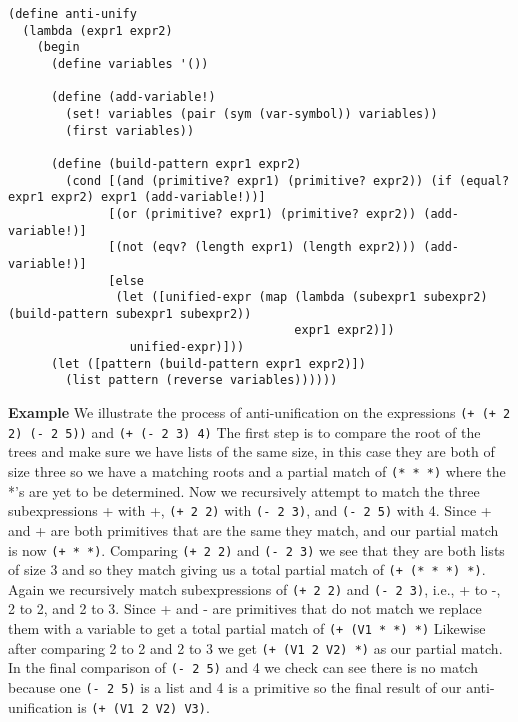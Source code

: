 \documentclass[a4paper,10pt]{article}
\begin{document}
\begin{lstlisting}[frame=trBL]
(define anti-unify
  (lambda (expr1 expr2)
    (begin
      (define variables '())

      (define (add-variable!)
        (set! variables (pair (sym (var-symbol)) variables))
        (first variables))
      
      (define (build-pattern expr1 expr2)
        (cond [(and (primitive? expr1) (primitive? expr2)) (if (equal? expr1 expr2) expr1 (add-variable!))]
              [(or (primitive? expr1) (primitive? expr2)) (add-variable!)]
              [(not (eqv? (length expr1) (length expr2))) (add-variable!)]
              [else
               (let ([unified-expr (map (lambda (subexpr1 subexpr2) (build-pattern subexpr1 subexpr2))
                                        expr1 expr2)])
                 unified-expr)]))
      (let ([pattern (build-pattern expr1 expr2)])
        (list pattern (reverse variables))))))
\end{lstlisting}

{\bf Example} We illustrate the process of anti-unification on the expressions \texttt{(+ (+ 2 2) (- 2 5))} and \texttt{(+ (- 2 3) 4)}
The first step is to compare the root of the trees and make sure we have lists of the same size, in this case they are both of size three so we have a matching roots and a partial match of \texttt{(* * *)} where the *'s are yet to be determined.
Now we recursively attempt to match the three subexpressions + with +, \texttt{(+ 2 2)} with \texttt{(- 2 3)}, and \texttt{(- 2 5)} with 4.
Since + and + are both primitives that are the same they match, and our partial match is now \texttt{(+ * *)}.
Comparing \texttt{(+ 2 2)} and \texttt{(- 2 3)} we see that they are both lists of size 3 and so they match giving us a total partial match of \texttt{(+ (* * *) *)}.
Again we recursively match subexpressions of \texttt{(+ 2 2)} and \texttt{(- 2 3)}, i.e., + to -, 2 to 2, and 2 to 3.
Since + and - are primitives that do not match we replace them with a variable to get a total partial match of \texttt{(+ (V1 * *) *)}
Likewise after comparing 2 to 2 and 2 to 3 we get \texttt{(+ (V1 2 V2) *)} as our partial match.
In the final comparison of \texttt{(- 2 5)} and 4 we check can see there is no match because one \texttt{(- 2 5)} is a list and 4 is a primitive so the final result of our anti-unification is \texttt{(+ (V1 2 V2) V3)}.
\end{document}

